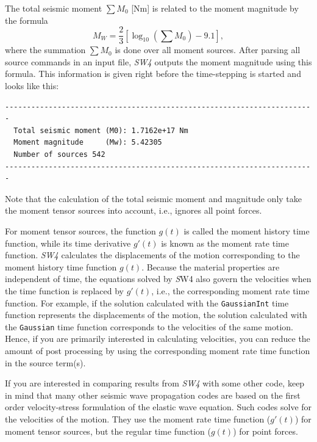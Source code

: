 \documentclass[11pt]{report}
\begin{document}
The total seismic moment $\sum M_0$ [Nm] is related to the moment magnitude by the formula
\[
M_W = \frac{2}{3}\left[\log_{10}\left(\sum M_0\right) - 9.1\right],
\]
where the summation $\sum M_0$ is done over all moment sources.
After parsing all source commands in an input file, \emph{SW4} outputs the moment magnitude using
this formula. This information is given right before the time-stepping is started and looks like this:
\begin{verbatim}
-----------------------------------------------------------------------
  Total seismic moment (M0): 1.7162e+17 Nm 
  Moment magnitude     (Mw): 5.42305
  Number of sources 542
-----------------------------------------------------------------------
\end{verbatim}
Note that the calculation of the total seismic moment and magnitude only take the moment tensor sources into
account, i.e., ignores all point forces.

For moment tensor sources, the function $g(t)$ is called the moment history time function, while its
time derivative $g'(t)$ is known as the moment rate time function. \emph{SW4} calculates the
displacements of the motion corresponding to the moment history time function $g(t)$. Because
the material properties are independent of time, the equations solved by {\emph SW4} also govern the
velocities when the time function is replaced by $g'(t)$, i.e., the corresponding moment rate time
function. For example, if the solution calculated with the {\tt GaussianInt} time function
represents the displacements of the motion, the solution calculated with the {\tt Gaussian} time
function corresponds to the velocities of the same motion. Hence, if you are primarily interested in
calculating velocities, you can reduce the amount of post processing by using the corresponding
moment rate time function in the source term(s). 

If you are interested in comparing results from \emph{SW4} with some other code, keep in mind that
many other seismic wave propagation codes are based on the first order velocity-stress formulation
of the elastic wave equation. Such codes solve for the velocities of the motion. They use the moment
rate time function ($g'(t)$) for moment tensor sources, but the regular time function ($g(t)$) for
point forces.
\end{document}
